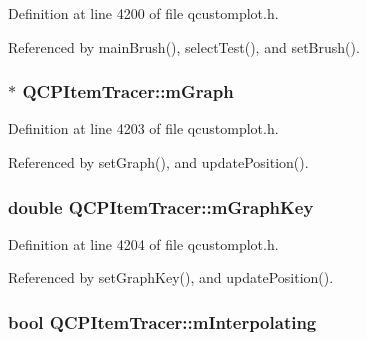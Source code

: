 Definition at line 4200 of file qcustomplot.\+h.



Referenced by main\+Brush(), select\+Test(), and set\+Brush().

\hypertarget{class_q_c_p_item_tracer_a2d70cf616b579563aa15f796dfc143ac}{}
\subsubsection[{m\+Graph}]{$\ast$ Q\+C\+P\+Item\+Tracer\+::m\+Graph\hspace{0.3cm}{\ttfamily [protected]}}\label{class_q_c_p_item_tracer_a2d70cf616b579563aa15f796dfc143ac}


Definition at line 4203 of file qcustomplot.\+h.



Referenced by set\+Graph(), and update\+Position().

\hypertarget{class_q_c_p_item_tracer_a8fa20f2e9ee07d21fd7c8d30ba4702ca}{}
\subsubsection[{m\+Graph\+Key}]{\setlength{\rightskip}{0pt plus 5cm}double Q\+C\+P\+Item\+Tracer\+::m\+Graph\+Key\hspace{0.3cm}{\ttfamily [protected]}}\label{class_q_c_p_item_tracer_a8fa20f2e9ee07d21fd7c8d30ba4702ca}


Definition at line 4204 of file qcustomplot.\+h.



Referenced by set\+Graph\+Key(), and update\+Position().

\hypertarget{class_q_c_p_item_tracer_afab37c22ad39f235921e86f93cd84595}{}
\subsubsection[{m\+Interpolating}]{\setlength{\rightskip}{0pt plus 5cm}bool Q\+C\+P\+Item\+Tracer\+::m\+Interpolating\hspace{0.3cm}{\ttfamily [protected]}}\label{class_q_c_p_item_tracer_afab37c22ad39f235921e86f93cd84595}


